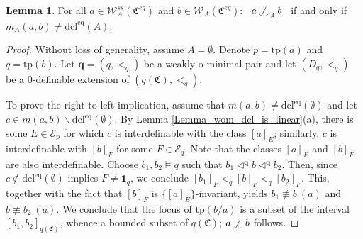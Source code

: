 \documentclass{amsart}
\theoremstyle{definition}
\newtheorem{Lemma}[Theorem]{Lemma}
\theoremstyle{definition}
\def\notind#1#2{#1\setbox0=\hbox{$#1x$}\kern\wd0
\hbox to 0pt{\mathchardef\nn=12854\hss$#1\nn$\kern1.4\wd0\hss}
\hbox to 0pt{\hss$#1\mid$\hss}\lower.9\ht0 \hbox to 0pt{\hss$#1\smile$\hss}\kern\wd0}
\def\dep{\mathop{\mathpalette\notind{}}}
\newcommand{\Mon}{\mathfrak C}
\newcommand{\Moneq}{\mathfrak C^{eq}}
\newcommand{\tp}{\mathrm{tp}}
\newcommand{\dcleq}{\mathrm{dcl^{eq}}}
\begin{document}
\begin{Lemma}\label{Lemma_ssi_implies_a ind b_iff_m(a b)=0}   
For all $a\in \mathcal W_A^{ss}(\Moneq)$ and $b\in \mathcal W_A(\Moneq)$: \  $a\dep_Ab$ \ if and only if \ $m_A(a,b)\neq\dcleq(A)$. 
\end{Lemma}
\begin{proof} Without loss of generality, assume $A=\emptyset$. Denote $p=\tp(a)$ and $q=\tp(b)$. Let $\mathbf q=(q,<_q)$ be a weakly o-minimal pair and let $(D_q,<_q)$ be a $0$-definable extension of $(q(\Mon),<_q)$.

To prove the right-to-left implication, assume that $m(a,b)\neq \dcleq(\emptyset)$ and let $c\in m(a,b)\smallsetminus\dcleq(\emptyset)$. By Lemma \ref{Lemma_wom_dcl_is_linear}(a), there is some $E\in\mathcal E_p$ for which $c$ is interdefinable with the class $[a]_E$; similarly, $c$ is interdefinable with $[b]_F$  for some $F\in\mathcal E_q$. Note that the classes $[a]_E$ and $[b]_F$ are also interdefinable. 
Choose $b_1,b_2\models q$ such that $b_1\triangleleft^\mathbf q b\triangleleft^\mathbf q b_2$. Then, since $c\notin\dcleq(\emptyset)$ implies $F\neq \mathbf 1_q$, we conclude $[b_1]_F<_q[b]_F<_q[b_2]_F$. This, together with the fact that $[b]_F$ is $\{[a]_E\}$-invariant, yields $b_1\nequiv b\ (a)$ and $b\nequiv b_2\ (a)$. We conclude that the locus of $\tp(b/a)$ is a subset of the interval $[b_1,b_2]_{q(\Mon)}$, whence  a bounded subset of $q(\Mon)$; $a\dep b$ follows.  


\end{proof}
\end{document}

